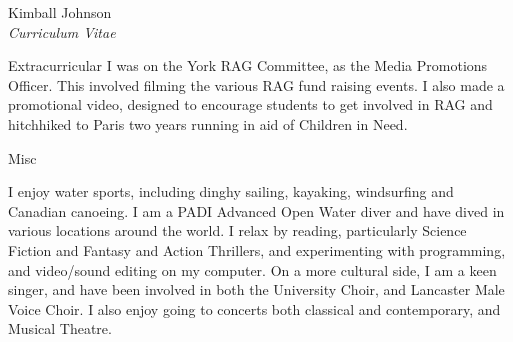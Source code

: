 \documentclass[10pt]{article}
\begin{document}
\begin{cv}{Kimball Johnson\\{\large \itshape Curriculum Vitae}}
\begin{cvlist}{Extracurricular}
I was on the York RAG Committee, as the Media Promotions Officer. This
involved filming the various RAG fund raising events. I also made a 
promotional video, designed to encourage students to get involved in RAG and 
hitchhiked to Paris two years running in aid of Children in Need.
\item Misc

I enjoy water sports, including dinghy sailing, kayaking, windsurfing and 
Canadian canoeing. I am a PADI Advanced Open Water diver and have dived in 
various locations around the world.
I relax by reading, particularly Science Fiction and Fantasy and 
Action Thrillers, and experimenting with programming, and video/sound editing 
on my computer.
On a more cultural side, I am a keen singer, and have been involved in both
the University Choir, and Lancaster Male Voice Choir.  I also enjoy going to
concerts both classical and contemporary, and Musical Theatre.
\end{cvlist}
\end{cv}
\end{document}
